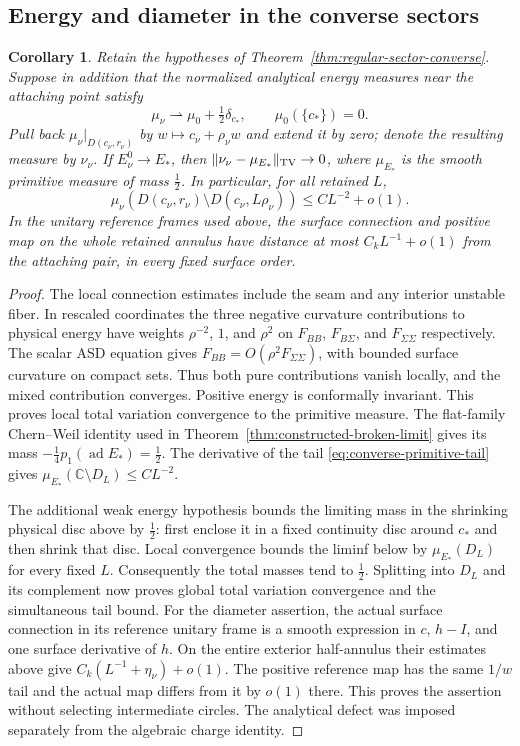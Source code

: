 \documentclass[11pt]{amsart}
\newtheorem{corollary}[theorem]{Corollary}
\theoremstyle{definition}
\theoremstyle{remark}
\theoremstyle{plain}
\newcommand{\CC}{\mathbb{C}}
\begin{document}
\subsection{Energy and diameter in the converse sectors}

\begin{corollary}\label{cor:converse-whole-neck}
Retain the hypotheses of Theorem~\ref{thm:regular-sector-converse}.
Suppose in addition that the normalized analytical energy measures
near the attaching point satisfy
\[
 \mu_\nu\rightharpoonup\mu_0+\tfrac12\delta_{c_*},
                         \qquad \mu_0(\{c_*\})=0 .
\]
Pull back $\mu_\nu|_{D(c_\nu,r_\nu)}$ by
$w\mapsto c_\nu+\rho_\nu w$ and extend it by zero;
denote the resulting measure by $\nu_\nu$.
If $E_\nu^0\to E_*$, then
$\|\nu_\nu-\mu_{E_*}\|_{\rm TV}\to0$, where $\mu_{E_*}$
is the smooth primitive measure of mass $\frac12$.
In particular, for all retained $L$,
\[
 \mu_\nu(D(c_\nu,r_\nu)\setminus D(c_\nu,L\rho_\nu))
                       \leq CL^{-2}+o(1).
\]
In the unitary reference frames used above, the surface
connection and positive map on the whole retained annulus
have distance at most $C_kL^{-1}+o(1)$ from the attaching
pair, in every fixed surface order.
\end{corollary}

\begin{proof}
The local connection estimates include the seam and any
interior unstable fiber. In rescaled coordinates the three
negative curvature contributions to physical energy have
weights $\rho^{-2}$, $1$, and $\rho^2$ on $F_{BB}$,
$F_{B\Sigma}$, and $F_{\Sigma\Sigma}$ respectively.
The scalar ASD equation gives
$F_{BB}=O(\rho^2F_{\Sigma\Sigma})$, with bounded surface
curvature on compact sets. Thus both pure contributions
vanish locally, and the mixed contribution converges.
Positive energy is conformally invariant. This proves local
total variation convergence to the primitive measure.
The flat-family Chern--Weil identity used in
Theorem~\ref{thm:constructed-broken-limit} gives its mass
$-\frac14p_1(\operatorname{ad}E_*)=\frac12$.
The derivative of the tail
\eqref{eq:converse-primitive-tail} gives
$\mu_{E_*}(\CC\setminus D_L)\leq CL^{-2}$.

The additional weak energy hypothesis bounds the limiting
mass in the shrinking physical disc above by $\frac12$:
first enclose it in a fixed continuity disc around $c_*$
and then shrink that disc. Local convergence bounds the
liminf below by $\mu_{E_*}(D_L)$ for every fixed $L$.
Consequently the total masses tend to $\frac12$.
Splitting into $D_L$ and its complement now proves global
total variation convergence and the simultaneous tail bound.
For the diameter assertion, the actual surface connection
in its reference unitary frame is a smooth expression in
$c$, $h-I$, and one surface derivative of $h$.
On the entire exterior half-annulus their estimates above
give $C_k(L^{-1}+\eta_\nu)+o(1)$.
The positive reference map has the same $1/w$ tail and
the actual map differs from it by $o(1)$ there.
This proves the assertion without selecting intermediate
circles. The analytical defect was imposed separately
from the algebraic charge identity.
\end{proof}
\end{document}
